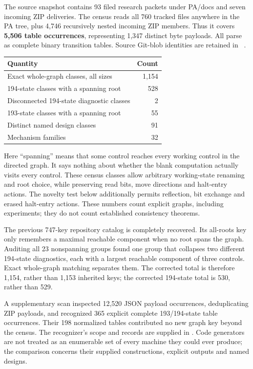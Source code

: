 The source snapshot contains 93 filed research packets under PA/docs and
seven incoming ZIP deliveries. The census reads all 760 tracked 
files anywhere in the PA tree, plus 4,746 recursively nested incoming ZIP
members. Thus it covers \textbf{5,506 table occurrences}, representing
1,347 distinct byte payloads. All parse as complete binary transition
tables. Source Git-blob identities are retained in
~\cite{pa,incoming}.

\begin{center}
\begin{tabular}{@{}lr@{}}
\toprule Quantity&Count\\\midrule
Exact whole-graph classes, all sizes&1,154\\
194-state classes with a spanning root&528\\
Disconnected 194-state diagnostic classes&2\\
193-state classes with a spanning root&55\\
Distinct named design classes&91\\
Mechanism families&32\\\bottomrule
\end{tabular}
\end{center}
Here ``spanning'' means that some control reaches every working control in
the directed graph. It says nothing about whether the blank computation
actually visits every control. These census classes allow arbitrary working-state
renaming and root choice, while preserving read bits, move directions and
halt-entry actions. The novelty test below additionally permits reflection,
bit exchange and erased halt-entry actions. These numbers count explicit
graphs, including experiments; they do not count established consistency
theorems.

The previous 747-key repository catalog is completely recovered. Its
all-roots key only remembers a maximal reachable component when no root
spans the graph. Auditing all 23 nonspanning groups found one group that
collapses two different 194-state diagnostics, each with a largest
reachable component of three controls. Exact whole-graph matching separates
them. The corrected total is therefore 1,154, rather than 1,153 inherited
keys; the corrected 194-state total is 530, rather than 529.

A supplementary scan inspected 12,520 JSON payload occurrences, deduplicating
ZIP payloads, and recognized 365 explicit complete 193/194-state table
occurrences. Their 198 normalized tables contributed no new graph key
beyond the  census. The recognizer's scope and records are supplied
in . Code generators are not treated as
an enumerable set of every machine they could ever produce; the comparison
concerns their supplied constructions, explicit outputs and named designs.

